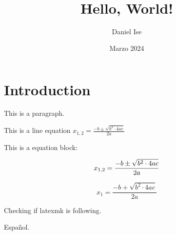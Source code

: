 \documentclass{article}
\title{Hello, World!}
\author{Daniel Ise}
\date{Marzo 2024}
\begin{document}

\section{Introduction}

This is a paragraph. 

This is a line equation $x_{1,2}=\frac{-b \pm \sqrt{b^{2} \cdot 4ac}}{2a}$

This is a equation block:

\begin{displaymath}
	x_{1,2}=\frac{-b \pm \sqrt{b^{2} \cdot 4ac}}{2a} \\
\end{displaymath}

\begin{displaymath}
	x_{1}=\frac{-b + \sqrt{b^{2} \cdot 4ac}}{2a}
\end{displaymath}

Checking if latexmk is following.

Español.
\end{document}
